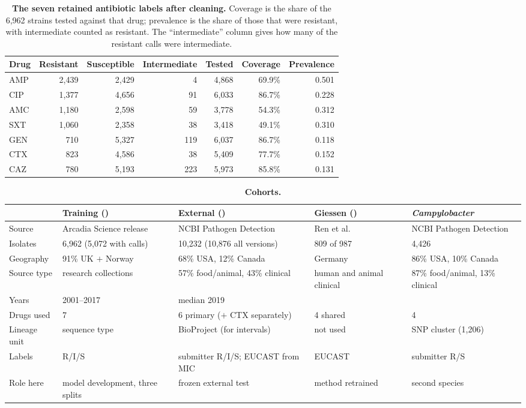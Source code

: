 \clearpage
\begin{table}[t]\centering\small
\caption{\textbf{The seven retained antibiotic labels after cleaning.} Coverage is the share of the
6,962 strains tested against that drug; prevalence is the share of those that were resistant, with
intermediate counted as resistant. The ``intermediate'' column gives how many of the resistant
calls were intermediate.}
\label{tab:labels}
\begin{tabular}{lrrrrrr}
\toprule
Drug & Resistant & Susceptible & Intermediate & Tested & Coverage & Prevalence \\
\midrule
AMP & 2,439 & 2,429 & 4 & 4,868 & 69.9\% & 0.501 \\
CIP & 1,377 & 4,656 & 91 & 6,033 & 86.7\% & 0.228 \\
AMC & 1,180 & 2,598 & 59 & 3,778 & 54.3\% & 0.312 \\
SXT & 1,060 & 2,358 & 38 & 3,418 & 49.1\% & 0.310 \\
GEN & 710 & 5,327 & 119 & 6,037 & 86.7\% & 0.118 \\
CTX & 823 & 4,586 & 38 & 5,409 & 77.7\% & 0.152 \\
CAZ & 780 & 5,193 & 223 & 5,973 & 85.8\% & 0.131 \\
\bottomrule
\end{tabular}
\end{table}

\begin{table}[t]\centering\small
\caption{\textbf{Cohorts.}}\label{tab:cohorts}
\begin{tabularx}{\linewidth}{lXXXX}
\toprule
 & Training (\Ecoli{}) & External (\Ecoli{}) & Giessen (\Ecoli{}) & \textit{Campylobacter} \\
\midrule
Source & Arcadia Science release & NCBI Pathogen Detection & Ren et al.\ \cite{ren2022giessen} & NCBI Pathogen Detection \\
Isolates & 6,962 (5,072 with calls) & 10,232 (10,876 all versions) & 809 of 987 & 4,426 \\
Geography & 91\% UK $+$ Norway & 68\% USA, 12\% Canada & Germany & 86\% USA, 10\% Canada \\
Source type & research collections & 57\% food/animal, 43\% clinical & human and animal clinical & 87\% food/animal, 13\% clinical \\
Years & 2001--2017 & median 2019 & \todo{} & \todo{} \\
Drugs used & 7 & 6 primary ($+$ CTX separately) & 4 shared & 4 \\
Lineage unit & sequence type & BioProject (for intervals) & not used & SNP cluster (1,206) \\
Labels & R/I/S & submitter R/I/S; EUCAST from MIC & EUCAST & submitter R/S \\
Role here & model development, three splits & frozen external test & method retrained & second species \\
\bottomrule
\end{tabularx}
\end{table}

